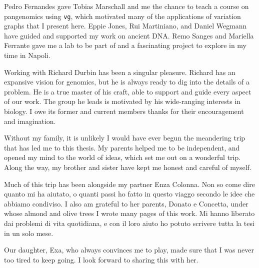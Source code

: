 \begin{acknowledgements}
  Pedro Fernandes gave Tobias Marschall and me the chance to teach a course on pangenomics using {\tt vg}, which motivated many of the applications of variation graphs that I present here.
  Eppie Jones, Rui Martiniano, and Daniel Wegmann have guided and supported my work on ancient DNA.
  Remo Sanges and Mariella Ferrante gave me a lab to be part of and a fascinating project to explore in my time in Napoli.
  
  Working with Richard Durbin has been a singular pleasure.
  Richard has an expansive vision for genomics, but he is always ready to dig into the details of a problem.
  He is a true master of his craft, able to support and guide every aspect of our work.
  The group he leads is motivated by his wide-ranging interests in biology.
  I owe its former and current members thanks for their encouragement and imagination.

  Without my family, it is unlikely I would have ever begun the meandering trip that has led me to this thesis.
  My parents helped me to be independent, and opened my mind to the world of ideas, which set me out on a wonderful trip.
  Along the way, my brother and sister have kept me honest and careful of myself.

  Much of this trip has been alongside my partner Enza Colonna.
  Non so come dire quanto mi ha aiutato, o quanti passi ho fatto in questo viaggo secondo le idee che abbiamo condiviso.
  I also am grateful to her parents, Donato e Concetta, under whose almond and olive trees I wrote many pages of this work.
  Mi hanno liberato dai problemi di vita quotidiana, e con il loro aiuto ho potuto scrivere tutta la tesi in un solo mese.
  
  Our daughter, Exa, who always convinces me to play, made sure that I was never too tired to keep going.
  I look forward to sharing this with her.



\end{acknowledgements}
